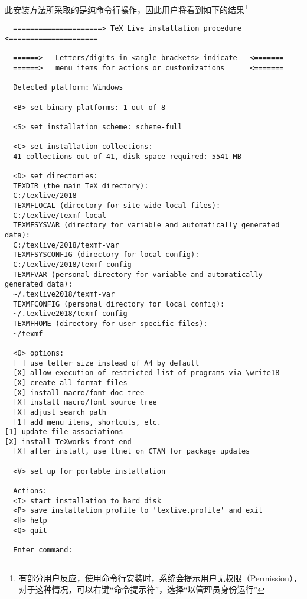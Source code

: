 \documentclass{ctexart}
\begin{document}
此安装方法所采取的是纯命令行操作，因此用户将看到如下的结果\footnote{有部分用户反应，使用命令行安装时，系统会提示用户无权限（Permission），对于这种情况，可以右键“命令提示符”，选择“以管理员身份运行”}
\begin{lstlisting}
  =====================> TeX Live installation procedure <=====================
  
  ======>   Letters/digits in <angle brackets> indicate   <=======
  ======>   menu items for actions or customizations      <=======
  
  Detected platform: Windows
  
  <B> set binary platforms: 1 out of 8
  
  <S> set installation scheme: scheme-full
  
  <C> set installation collections:
  41 collections out of 41, disk space required: 5541 MB
  
  <D> set directories:
  TEXDIR (the main TeX directory):
  C:/texlive/2018
  TEXMFLOCAL (directory for site-wide local files):
  C:/texlive/texmf-local
  TEXMFSYSVAR (directory for variable and automatically generated data):
  C:/texlive/2018/texmf-var
  TEXMFSYSCONFIG (directory for local config):
  C:/texlive/2018/texmf-config
  TEXMFVAR (personal directory for variable and automatically generated data):
  ~/.texlive2018/texmf-var
  TEXMFCONFIG (personal directory for local config):
  ~/.texlive2018/texmf-config
  TEXMFHOME (directory for user-specific files):
  ~/texmf
  
  <O> options:
  [ ] use letter size instead of A4 by default
  [X] allow execution of restricted list of programs via \write18
  [X] create all format files
  [X] install macro/font doc tree
  [X] install macro/font source tree
  [X] adjust search path
  [1] add menu items, shortcuts, etc.                                                                                                                                                                                                          [1] update file associations                                                                                                                                                                                                                 [X] install TeXworks front end
  [X] after install, use tlnet on CTAN for package updates
  
  <V> set up for portable installation
  
  Actions:
  <I> start installation to hard disk
  <P> save installation profile to 'texlive.profile' and exit
  <H> help
  <Q> quit
  
  Enter command:
\end{lstlisting}
\end{document}
